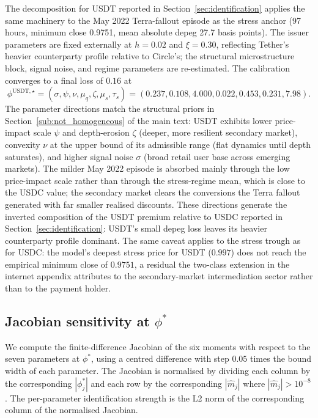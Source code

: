 The decomposition for USDT reported in Section~\ref{sec:identification} applies the same machinery to the May 2022 Terra-fallout episode as the stress anchor (97 hours, minimum close 0.9751, mean absolute depeg 27.7 basis points). The issuer parameters are fixed externally at $h = 0.02$ and $\xi = 0.30$, reflecting Tether's heavier counterparty profile relative to Circle's; the structural microstructure block, signal noise, and regime parameters are re-estimated. The calibration converges to a final loss of $0.16$ at
\begin{equation}\label{eq:phi_star_usdt}
\phi^{\text{USDT},\star} = (\sigma, \psi, \nu, \mu_q, \zeta, \mu_s, \tau_s) = (0.237, 0.108, 4.000, 0.022, 0.453, 0.231, 7.98).
\end{equation}
The parameter directions match the structural priors in Section~\ref{sub:not_homogeneous} of the main text: USDT exhibits lower price-impact scale $\psi$ and depth-erosion $\zeta$ (deeper, more resilient secondary market), convexity $\nu$ at the upper bound of its admissible range (flat dynamics until depth saturates), and higher signal noise $\sigma$ (broad retail user base across emerging markets). The milder May 2022 episode is absorbed mainly through the low price-impact scale rather than through the stress-regime mean, which is close to the USDC value; the secondary market clears the conversions the Terra fallout generated with far smaller realised discounts. These directions generate the inverted composition of the USDT premium relative to USDC reported in Section~\ref{sec:identification}: USDT's small depeg loss leaves its heavier counterparty profile dominant. The same caveat applies to the stress trough as for USDC: the model's deepest stress price for USDT ($0.997$) does not reach the empirical minimum close of $0.9751$, a residual the two-class extension in the internet appendix attributes to the secondary-market intermediation sector rather than to the payment holder.

\subsection{Jacobian sensitivity at $\phi^*$}\label{sub:jacobian}

We compute the finite-difference Jacobian of the six moments with respect to the seven parameters at $\phi^*$, using a centred difference with step $0.05$ times the bound width of each parameter. The Jacobian is normalised by dividing each column by the corresponding $|\phi^*_j|$ and each row by the corresponding $|\hat m_j|$ where $|\hat m_j| > 10^{-8}$. The per-parameter identification strength is the L2 norm of the corresponding column of the normalised Jacobian.

